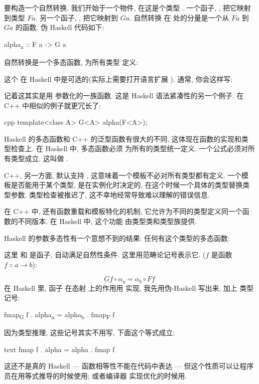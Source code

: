 要构造一个自然转换, 我们开始于一个物件, 在这是个类型 . 一个函子, , 把它映射到类型 $F a$.
另一个函子, , 把它映射到 $G a$. 自然转换  在  处的分量是一个从 $F a$ 到 $G a$
的函数. 伪 Haskell 代码如下:

\begin{snipv}
alpha\textsubscript{a} :: F a -> G a
\end{snipv}
自然转换是一个多态函数, 为所有类型  定义:

这个  在 Haskell 中是可选的(实际上需要打开语言扩展 ). 通常, 你会这样写:

记着这其实是用  参数化的一族函数. 这是 Haskell 语法紧凑性的另一个例子. 在 C++ 中相似的例子就更冗长了:

\begin{snip}{cpp}
template<class A> G<A> alpha(F<A>);
\end{snip}
Haskell 的多态函数和 C++ 的泛型函数有很大的不同, 这体现在函数的实现和类型检查上. 在 Haskell 中, 多态函数必须
为所有的类型统一定义. 一个公式必须对所有类型成立. 这叫做 .

C++, 另一方面, 默认支持 , 这意味着一个模板不必对所有类型都有定义.
一个模板是否能用于某个类型, 是在实例化时决定的, 在这个时候一个具体的类型替换类型参数. 类型检查被推迟了,
这不幸地经常导致难以理解的错误信息.

在 C++ 中, 还有函数重载和模板特化的机制, 它允许为不同的类型定义同一个函数的不同版本. 在 Haskell 中, 这个功能
由类型类和类型族提供.

Haskell 的参数多态性有一个意想不到的结果: 任何有这个类型的多态函数:

这里  和  是函子, 自动满足自然性条件. 这里用范畴论记号表示它. ($f$
是函数 $f \Colon a \to b$):

\[G f \circ \alpha_a = \alpha_b \circ F f\]
在 Haskell 里, 函子  在态射  上的作用用  实现, 我先用伪-Haskell 写出来, 加上
类型记号:

\begin{snipv}
fmap\textsubscript{G} f . alpha\textsubscript{a} = alpha\textsubscript{b} . fmap\textsubscript{F} f
\end{snipv}
因为类型推理, 这些记号其实不用写, 下面这个等式成立:

\begin{snip}{text}
fmap f . alpha = alpha . fmap f
\end{snip}
这还不是真的 Haskell --- 函数相等性不能在代码中表达 --- 但这个性质可以让程序员在用等式推导的时候使用; 或者编译器
实现优化的时候用.

